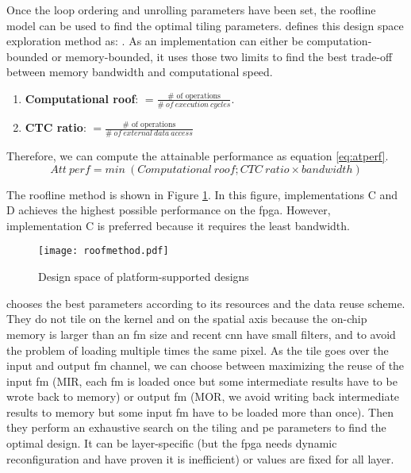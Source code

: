 Once the loop ordering and unrolling parameters have been set, the roofline model can be used to find the optimal tiling parameters. \textcite{mittal_survey_2020} defines this design space exploration method as: . As an implementation can either be computation-bounded or memory-bounded, it uses those two limits to find the best trade-off between memory bandwidth and computational speed.
\begin{enumerate}
    \item \textbf{Computational roof}: $= \frac{\text{\# \ of \ operations}}{\# \ of \ execution \ cycles}$.
    \item \textbf{CTC ratio}: $= \frac{\text{\# \ of \ operations}}{\# \ of \ external \ data \ access}$
\end{enumerate}
Therefore, we can compute the attainable performance as equation \ref{eq:atperf}.
\begin{equation}
Att \ perf = min \ (Computational \ roof; CTC \ ratio \times bandwidth)
\label{eq:atperf}
\end{equation}

The roofline method is shown in Figure \ref{fig:roofmeth}. In this figure, implementations C and D achieves the highest possible performance on the \acrshort{fpga}. However, implementation C is preferred because it requires the least bandwidth.
%
\begin{figure}
    \centering
    \texttt{[image: roofmethod.pdf]}
    \caption{Design space of platform-supported designs  \cite{zhang_optimizing_2015}}
    \label{fig:roofmeth}
\end{figure}

\textcite{motamedi_placid_2017} chooses the best parameters according to its resources and the data reuse scheme. They do not tile on the kernel and on the spatial axis because the on-chip memory is larger than an \acrshort{fm} size and recent \acrshort{cnn} have small filters, and to avoid the problem of loading multiple times the same pixel. As the tile goes over the input and output \acrshort{fm} channel, we can choose between maximizing the reuse of the input \acrshort{fm} (MIR, each \acrshort{fm} is loaded once but some intermediate results have to be wrote back to memory) or output \acrshort{fm} (MOR, we avoid writing back intermediate results to memory but some input \acrshort{fm} have to be loaded more than once). Then they perform an exhaustive search on the tiling and \acrshort{pe} parameters to find the optimal design. It can be layer-specific (but the \acrshort{fpga} needs dynamic reconfiguration and \textcite{zhang_optimizing_2015} have proven it is inefficient) or values are fixed for all layer.

